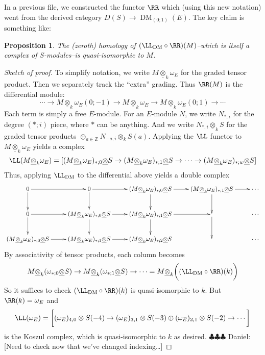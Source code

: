 \documentclass[12pt]{amsart}
\newtheorem{prop}[lemma]{Proposition}
\theoremstyle{definition}
\theoremstyle{remark}
\newcommand{\ZZ}{\mathbb Z}
\newcommand{\Gotimes}{\underline{\otimes}}
\newcommand{\daniel}[1]{{\color{blue} \sf $\clubsuit\clubsuit\clubsuit$ Daniel: [#1]}}
\def\DM{\operatorname{DM}}
\begin{document}
In a previous file, we constructed the functor $\RR$ which (using this new notation) went from the derived category $D(S)\to \DM_{(0;1)}(E)$.  The key claim is something like:
\begin{prop}
The (zeroth) homology of $(\LL_{\DM} \circ \RR)(M)$--which is itself a complex of $S$-modules--is quasi-isomorphic to $M$.
\end{prop}
\begin{proof}[Sketch of proof]
To simplify notation, we write $M\Gotimes_k \omega_E$ for the graded tensor product.  Then we separately track the ``extra'' grading.  Thus $\RR(M)$ is the differential module:
\[
\cdots \to M\Gotimes_k \omega_E(0;-1) \to M\Gotimes_k  \omega_E \to M\Gotimes_k  \omega_E(0;1) \to \cdots
\]
Each term is simply a free $E$-module.  For an $E$-module $N$, we write $N_{*;i}$ for the degree $(*;i)$ piece, where $*$ can be anything.   And we write $N_{*,i}\Gotimes_k S$ for the graded tensor products $\oplus_{a\in \ZZ} N_{-a,i}\otimes_k S(a)$.  Applying  the $\LL$ functor to $M\Gotimes_k \omega_E$ yields a complex
\[
\LL(M\Gotimes_k \omega_E) =[ (M\Gotimes_k \omega_E)_{*;0} \Gotimes S \to (M\Gotimes_k \omega_E)_{*;1} \Gotimes S \to \cdots \to (M\Gotimes_k \omega_E)_{*;w} \Gotimes S]
\]
Thus, applying $\LL_{\DM}$ to the differential above yields a double complex
\[
\xymatrix{
0\ar[d]\ar[r]&0\ar[d]\ar[r]&(M\Gotimes_k \omega_E)_{*;0} \Gotimes S \ar[r]\ar[d]& (M\Gotimes_k \omega_E)_{*;1} \Gotimes S \ar[r]\ar[d]& \cdots\\
0\ar[d]\ar[r]&(M\Gotimes_k \omega_E)_{*;0} \Gotimes S \ar[r]\ar[d]& (M\Gotimes_k \omega_E)_{*;1} \Gotimes S \ar[r]\ar[d]&\ar[d]& \cdots\\
(M\Gotimes_k \omega_E)_{*;0} \Gotimes S \ar[r]& (M\Gotimes_k \omega_E)_{*;1} \Gotimes S \ar[r]& (M\Gotimes_k \omega_E)_{*;2} \Gotimes S &&\cdots\\
}
\]
By associativity of tensor products, each column becomes
\[
M\Gotimes_k (\omega_{*;0} \Gotimes S)\to M\Gotimes_k (\omega_{*;1} \Gotimes S)\to \cdots = M \Gotimes_k \bigg( (\LL_{\DM}\circ \RR)(k)\bigg)
\]
So it suffices to check $(\LL_{\DM}\circ \RR)(k)$ is quasi-isomorphic to $k$.  But $\RR(k)=\omega_E$ and
\[
\LL(\omega_E) = \bigg[ (\omega_E)_{4,0}\otimes S(-4) \to (\omega_E)_{3,1}\otimes S(-3) \oplus (\omega_E)_{2,1}\otimes S(-2) \to \cdots  \bigg]
\]
is the Koszul complex, which is quasi-isomorphic to $k$ as desired. \daniel{Need to check now that we've changed indexing\dots}
\end{proof}
\end{document}
